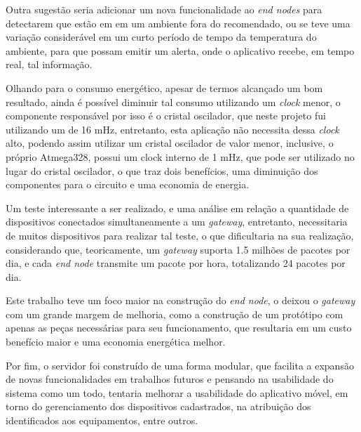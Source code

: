 Outra sugestão seria adicionar um nova funcionalidade ao \textit{end nodes} para detectarem que estão em em um ambiente fora do recomendado, ou se teve uma variação considerável em um curto período de tempo da temperatura do ambiente, para que possam emitir um alerta, onde o aplicativo recebe, em tempo real, tal informação.

Olhando para o consumo energético, apesar de termos alcançado um bom resultado, ainda é possível diminuir tal consumo utilizando um \textit{clock} menor, o componente responsável por isso é o cristal oscilador, que neste projeto fui utilizando um de 16 mHz,  entretanto, esta aplicação não necessita dessa \textit{clock} alto, podendo assim utilizar um cristal oscilador de valor menor, inclusive, o próprio Atmega328, possui um clock interno de 1 mHz, que pode ser utilizado no lugar do cristal oscilador, o que traz dois benefícios, uma diminuição dos componentes para o circuito e uma economia de energia.

Um teste interessante a ser realizado, e uma análise em relação a quantidade de dispositivos conectados simultaneamente a um \textit{gateway}, entretanto, necessitaria de muitos dispositivos para realizar tal teste, o que dificultaria na sua realização, considerando que, teoricamente, um \textit{gateway} suporta 1.5 milhões de pacotes por dia, e cada \textit{end node} transmite um pacote por hora, totalizando 24 pacotes por dia.

Este trabalho teve um foco maior na construção do \textit{end node}, o deixou o \textit{gateway} com um grande margem de melhoria, como a construção de um protótipo com apenas as peças necessárias para seu funcionamento, que resultaria em um custo benefício maior e uma economia energética melhor.

Por fim, o servidor foi construído de uma forma modular, que facilita a expansão de novas funcionalidades em trabalhos futuros e pensando na usabilidade do sistema como um todo, tentaria melhorar a usabilidade do aplicativo móvel, em torno do gerenciamento dos dispositivos cadastrados, na atribuição dos identificados aos equipamentos, entre outros.